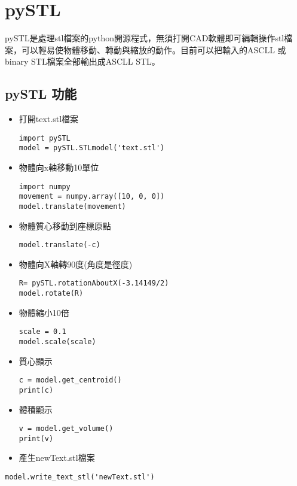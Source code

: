 \chapter{pySTL}
 pySTL是處理stl檔案的python開源程式，無須打開CAD軟體即可編輯操作stl檔案，可以輕易使物體移動、轉動與縮放的動作。目前可以把輸入的ASCLL 或 binary STL檔案全部輸出成ASCLL STL。\\
 

\section{pySTL 功能}
\begin{itemize}
\item 打開text.stl檔案
\begin{lstlisting}[caption=\Large 輸入檔案]
import pySTL
model = pySTL.STLmodel('text.stl')

\end{lstlisting}
 
\item 物體向x軸移動10單位
 \begin{lstlisting}[caption=\Large 移動]
import numpy
movement = numpy.array([10, 0, 0])
model.translate(movement)

\end{lstlisting}

\item 物體質心移動到座標原點
 \begin{lstlisting}[caption=\Large 移動]
model.translate(-c)

\end{lstlisting}

\item 物體向X軸轉90度(角度是徑度)
 \begin{lstlisting}[caption=\Large 轉動]
R= pySTL.rotationAboutX(-3.14149/2)
model.rotate(R)

\end{lstlisting}

\item 物體縮小10倍
 \begin{lstlisting}[caption=\Large 縮放]
scale = 0.1
model.scale(scale)

\end{lstlisting}


\item 質心顯示
 \begin{lstlisting}[caption=\Large 數值]
c = model.get_centroid()
print(c)

\end{lstlisting}

\item 體積顯示
 \begin{lstlisting}[caption=\Large 數值]
v = model.get_volume()
print(v)

\end{lstlisting}

\item 產生newText.stl檔案
\end{itemize}
 \begin{lstlisting}[caption=\Large 產生新stl檔案]
model.write_text_stl('newText.stl')
\end{lstlisting}

